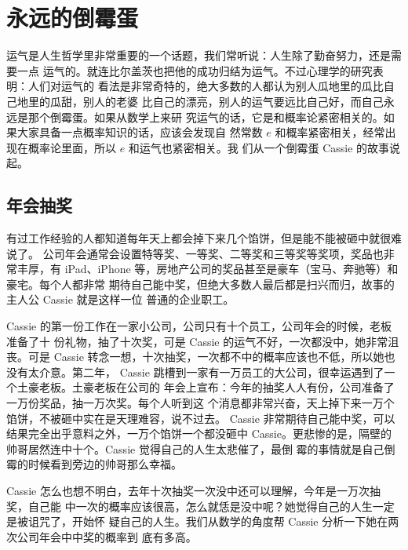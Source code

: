 %

\chapter{永远的倒霉蛋}

运气是人生哲学里非常重要的一个话题，我们常听说：人生除了勤奋努力，还是需要一点
运气的。就连比尔盖茨也把他的成功归结为运气。不过心理学的研究表明：人们对运气的
看法是非常奇特的，绝大多数的人都认为别人瓜地里的瓜比自己地里的瓜甜，别人的老婆
比自己的漂亮，别人的运气要远比自己好，而自己永远是那个倒霉蛋。如果从数学上来研
究运气的话，它是和概率论紧密相关的。如果大家具备一点概率知识的话，应该会发现自
然常数 $e$ 和概率紧密相关，经常出现在概率论里面，所以 $e$ 和运气也紧密相关。我
们从一个倒霉蛋 Cassie 的故事说起。

\section{年会抽奖}

有过工作经验的人都知道每年天上都会掉下来几个馅饼，但是能不能被砸中就很难说了。
公司年会通常会设置特等奖、一等奖、二等奖和三等奖等奖项，奖品也非常丰厚，有 
iPad、iPhone 等，房地产公司的奖品甚至是豪车（宝马、奔驰等）和豪宅。每个人都非常
期待自己能中奖，但绝大多数人最后都是扫兴而归，故事的主人公 Cassie 就是这样一位
普通的企业职工。

Cassie 的第一份工作在一家小公司，公司只有十个员工，公司年会的时候，老板准备了十
份礼物，抽了十次奖，可是 Cassie 的运气不好，一次都没中，她非常沮丧。可是 Cassie
转念一想，十次抽奖，一次都不中的概率应该也不低，所以她也没有太介意。第二年，
Cassie 跳槽到一家有一万员工的大公司，很幸运遇到了一个土豪老板。土豪老板在公司的
年会上宣布：今年的抽奖人人有份，公司准备了一万份奖品，抽一万次奖。每个人听到这
个消息都非常兴奋，天上掉下来一万个馅饼，不被砸中实在是天理难容，说不过去。
Cassie 非常期待自己能中奖，可以结果完全出乎意料之外，一万个馅饼一个都没砸中 
Cassie。更悲惨的是，隔壁的帅哥居然连中十个。Cassie 觉得自己的人生太悲催了，最倒
霉的事情就是自己倒霉的时候看到旁边的帅哥那么幸福。

Cassie 怎么也想不明白，去年十次抽奖一次没中还可以理解，今年是一万次抽奖，自己能
中一次的概率应该很高，怎么就恁是没中呢？她觉得自己的人生一定是被诅咒了，开始怀
疑自己的人生。我们从数学的角度帮 Cassie 分析一下她在两次公司年会中中奖的概率到
底有多高。

